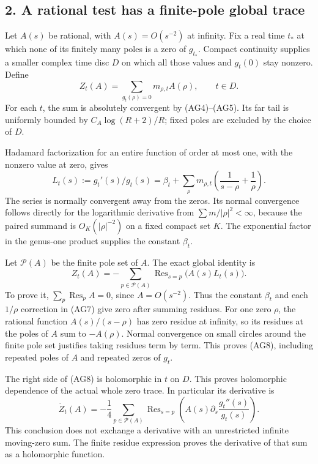 \documentclass[
  10pt,
  a4paper,
]{article}
\begin{document}
\subsection{2. A rational test has a finite-pole global
trace}\label{a-rational-test-has-a-finite-pole-global-trace}

Let \(A(s)\) be rational, with \(A(s)=O(s^{-2})\) at infinity. Fix a
real time \(t_*\) at which none of its finitely many poles is a zero of
\(g_{t_*}\). Compact continuity supplies a smaller complex time disc
\(D\) on which all those values and \(g_t(0)\) stay nonzero. Define \[
Z_t(A)=\sum_{g_t(\rho)=0}m_{\rho,t}A(\rho),\qquad t\in D.
\tag{AG6}
\] For each \(t\), the sum is absolutely convergent by (AG4)--(AG5). Its
far tail is uniformly bounded by \(C_A\log(R+2)/R\); fixed poles are
excluded by the choice of \(D\).

Hadamard factorization for an entire function of order at most one, with
the nonzero value at zero, gives \[
L_t(s):=g_t'(s)/g_t(s)
=\beta_t+\sum_\rho m_{\rho,t}
\left(\frac1{s-\rho}+\frac1\rho\right).
\tag{AG7}
\] The series is normally convergent away from the zeros. Its normal
convergence follows directly for the logarithmic derivative from
\(\sum m/|\rho|^2<\infty\), because the paired summand is
\(O_K(|\rho|^{-2})\) on a fixed compact set \(K\). The exponential
factor in the genus-one product supplies the constant \(\beta_t\).

Let \(\mathcal P(A)\) be the finite pole set of \(A\). The exact global
identity is \[
\boxed{Z_t(A)=-\sum_{p\in\mathcal P(A)}
\operatorname{Res}_{s=p}\bigl(A(s)L_t(s)\bigr).}
\tag{AG8}
\] To prove it, \(\sum_p\operatorname{Res}_pA=0\), since
\(A=O(s^{-2})\). Thus the constant \(\beta_t\) and each \(1/\rho\)
correction in (AG7) give zero after summing residues. For one zero
\(\rho\), the rational function \(A(s)/(s-\rho)\) has zero residue at
infinity, so its residues at the poles of \(A\) sum to \(-A(\rho)\).
Normal convergence on small circles around the finite pole set justifies
taking residues term by term. This proves (AG8), including repeated
poles of \(A\) and repeated zeros of \(g_t\).

The right side of (AG8) is holomorphic in \(t\) on \(D\). This proves
holomorphic dependence of the actual whole zero trace. In particular its
derivative is \[
\dot Z_t(A)=-\frac14\sum_{p\in\mathcal P(A)}
\operatorname{Res}_{s=p}\left(A(s)\partial_s\frac{g_t''(s)}{g_t(s)}\right).
\tag{AG9}
\] This conclusion does not exchange a derivative with an unrestricted
infinite moving-zero sum. The finite residue expression proves the
derivative of that sum as a holomorphic function.
\end{document}
